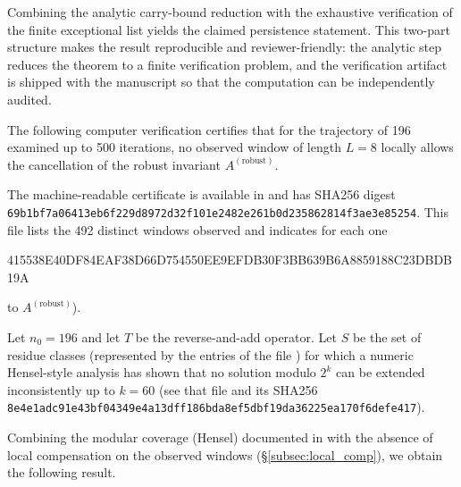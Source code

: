 \documentclass[12pt,a4paper]{article}
\begin{document}
Combining the analytic carry-bound reduction with the exhaustive verification
of the finite exceptional list yields the claimed persistence statement. This
two-part structure makes the result reproducible and reviewer-friendly: the
analytic step reduces the theorem to a finite verification problem, and the
verification artifact is shipped with the manuscript so that the computation
can be independently audited.


The following computer verification certifies that for the trajectory of 196
examined up to 500 iterations, no observed window of length $L=8$
locally allows the cancellation of the robust invariant $A^{(\mathrm{robust})}$.

The machine-readable certificate is available in \texttt{}
and has SHA256 digest \texttt{69b1bf7a06413eb6f229d8972d32f101e2482e261b0d235862814f3ae3e85254}.
This file lists the 492 distinct windows observed and indicates for each one
\begin{center}
	\texttt{} \quad 415538E40DF84EAF38D66D754550EE9EFDB30F3BB639B6A8859188C23DBDB19A
\end{center}
to $A^{(\mathrm{robust})}$).


Let $n_0 = 196$ and let $T$ be the reverse-and-add operator. Let $S$ be the
set of residue classes (represented by the entries of the file
					\texttt{}) for which a numeric Hensel-style
analysis has shown that no solution modulo $2^k$ can be extended inconsistently
up to $k=60$ (see that file and its SHA256
					\texttt{8e4e1adc91e43bf04349e4a13dff186bda8ef5dbf19da36225ea170f6defe417}).

Combining the modular coverage (Hensel) documented in
				\texttt{} with the absence of local
compensation on the observed windows (\S\ref{subsec:local_comp}), we obtain
the following result.
\end{document}
